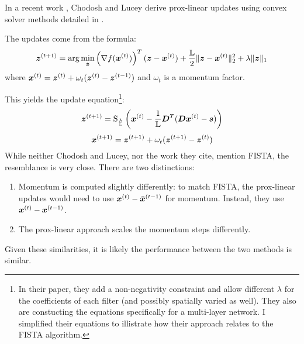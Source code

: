 In a recent work \cite{chodosh2020use}, Chodosh and Lucey derive prox-linear updates using convex solver methods detailed in \cite{xu2013block}.

The updates come from the formula:
\begin{equation}
\bm{z}^{(t + 1)} = \arg\min_{\bm{z}} \left(\nabla f(\bm{x}^{(t)})\right)^T(\bm{z} - \bm{x}^{(t)}) + \frac{\mathbb{L}}{2}\|\bm{z} - \bm{x}^{(t)}\|_2^2 + \lambda\|\bm{z}\|_1
\end{equation}
%
where $\bm{x}^{(t)} = \bm{z}^{(t)} + \omega_t(\bm{z}^{(t)} - \bm{z}^{(t - 1)})$ and $\omega_t$ is a momentum factor.

This yields the update equation\footnote{In their paper, they add a non-negativity constraint and allow different $\lambda$ for the coefficients of each filter (and possibly spatially varied as well). They also are constucting the equations specifically for a multi-layer network. I simplified their equations to illistrate how their approach relates to the FISTA algorithm.}:
\begin{equation}
\bm{z}^{(t + 1)} = \operatorname{S}_{\frac{\lambda}{\mathbb{L}}}\left(\bm{x}^{(t)} - \frac{1}{\mathbb{L}}\bm{D}^T(\bm{D}\bm{x}^{(t)} - \bm{s})\right)
\end{equation}
%
\begin{equation}
\bm{x}^{(t + 1)} = \bm{z}^{(t + 1)} + \omega_t(\bm{z}^{(t + 1)} - \bm{z}^{(t)})
\end{equation}
%
While neither Chodosh and Lucey, nor the work they cite, mention FISTA, the resemblance is very close. There are two distinctions:
\begin{enumerate}
\item Momentum is computed slightly differently: to match FISTA, the prox-linear updates would need to use $\bm{x}^{(t)} - \bar{\bm{x}}^{(t - 1)}$ for momentum. Instead, they use $\bm{x}^{(t)} - \bm{x}^{(t - 1)}$.
\item The prox-linear approach scales the momentum steps differently.
\end{enumerate}

Given these similarities, it is likely the performance between the two methods is similar.

